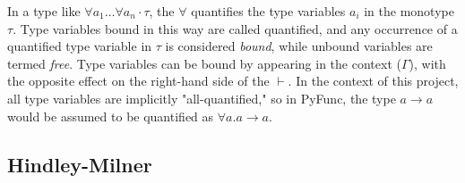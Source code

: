 \documentclass{l4proj}
\begin{document}
In a type like $\forall a_1 \dots \forall a_n \cdot \tau$, the $\forall$ quantifies the type variables $a_i$ in the monotype $\tau$.
Type variables bound in this way are called quantified, and any occurrence of a quantified type variable in $\tau$ is considered \emph{bound}, while unbound variables are termed \emph{free}.
Type variables can be bound by appearing in the context ($\Gamma$), with the opposite effect on the right-hand side of the $\vdash$.
In the context of this project, all type variables are implicitly "all-quantified," so in PyFunc, the type $a \rightarrow a$ would be assumed to be quantified as $\forall a.a \rightarrow a$.

\subsection{Hindley-Milner}
\end{document}
